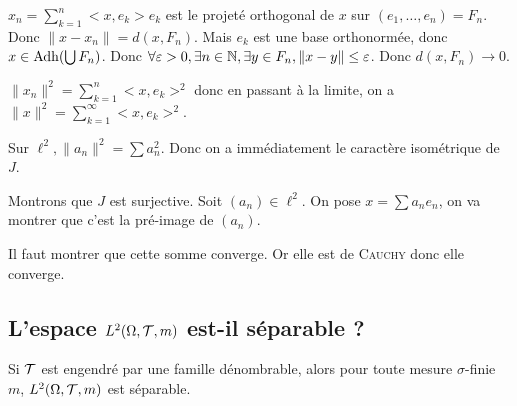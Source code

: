 \documentclass[10pt,a4paper,notitlepage ]{report}
\begin{document}
\begin{demo}
	$x_n = \sum_{k=1}^n <x,e_k> e_k$ est le projeté orthogonal de $x$ sur $(e_1,\dots,e_n) = F_n$. Donc $\|x-x_n\| = d(x,F_n)$. Mais $e_k$ est une base orthonormée, donc $x\in \operatorname{Adh}(\bigcup F_n)$. Donc $\forall \varepsilon > 0, \exists n\in\mathbb N, \exists y\in F_n, \|x-y\| \le \varepsilon$. Donc $d(x,F_n) \rightarrow 0$.
	
	$\|x_n\|^2 = \sum_{k=1}^n <x,e_k>^2$ donc en passant à la limite, on a $\|x\|^2 = \sum_{k=1}^\infty <x,e_k>^2$.
	
	Sur $\ell^2, \|a_n\|^2 = \sum a_n^2$. Donc on a immédiatement le caractère isométrique de $J$. 
	
	Montrons que $J$ est surjective. Soit $(a_n)\in \ell^2$. On pose $x=\sum a_ne_n$, on va montrer que c'est la pré-image de $(a_n)$.
	
	Il faut montrer que cette somme converge. Or elle est de \textsc{Cauchy} donc elle converge.
\end{demo}

\subsection{L'espace $L^2(\Omega,\mathcal T,m)$ est-il séparable ?}

\begin{theorem}
	Si $\mathcal T$ est engendré par une famille dénombrable, alors pour toute mesure $\sigma$-finie $m$, $L^2(\Omega,\mathcal T,m)$ est séparable.
\end{theorem}
\end{document}
